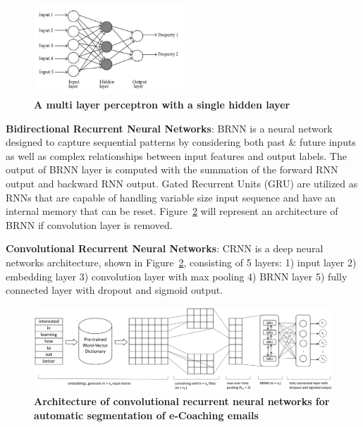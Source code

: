 \documentclass{amia}
\begin{document}
\begin{figure}[!htb]
    \centering
    \includegraphics[width=0.5\textwidth]{figures/mlp.jpeg}
    \caption{\textbf{A multi layer perceptron with a single hidden layer}}
    \label{fig:mlp}
\end{figure}

\textbf{Bidirectional Recurrent Neural Networks}: BRNN is a neural network designed to capture sequential patterns by considering both past \& future inputs as well as complex relationships between input features and output labels.\cite{schuster1997bidirectional} The output of BRNN layer is computed with the summation of the forward RNN output and backward RNN output. Gated Recurrent Units (GRU)\cite{chung2014empirical} are utilized as RNNs that are capable of handling variable size input sequence and have an internal memory that can be reset. Figure~\ref{fig:crnn} will represent an architecture of BRNN if convolution layer is removed.  

\textbf{Convolutional Recurrent Neural Networks}: CRNN is a deep neural networks architecture,\cite{treviso2017sentence} shown in Figure~\ref{fig:crnn}, consisting of 5 layers: 1) input layer 2) embedding layer 3) convolution layer with max pooling 4) BRNN layer 5) fully connected layer with dropout and sigmoid output. 

\begin{figure}[!htb]
    \centering
    \includegraphics[width=1.0\textwidth]{figures/CRNN.eps}
    \caption{\textbf{Architecture of convolutional recurrent neural networks for automatic segmentation of e-Coaching emails}}
    \label{fig:crnn}
\end{figure}
\end{document}

